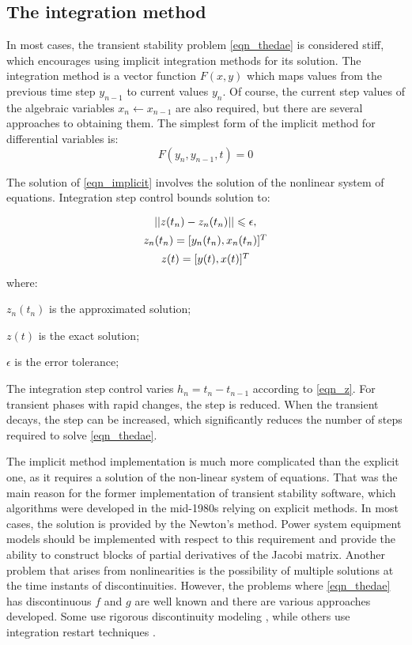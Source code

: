 \documentclass[lettersize,journal]{IEEEtran}
\begin{document}
\subsection{The integration method}

In most cases, the transient stability problem \eqref{eqn_thedae} is considered stiff, which encourages using implicit integration methods for its solution. The integration method is a vector function \(F(x,y)\) which maps values from the previous time step \(y_{n-1}\) to current values \(y_n\). Of course, the current step values of the algebraic variables \(x_{n} \leftarrow x_{n-1}\) are also required, but there are several approaches to obtaining them. The simplest form of the implicit method for differential variables is:
\begin{equation}
	\label{eqn_implicit}
	F(y_n,y_{n-1},t)=0
\end{equation}

The solution of \eqref{eqn_implicit} involves the solution of the nonlinear system of equations. Integration step control bounds solution to:
\begin{equation}
	\label{eqn_z}
	\def\arraystretch{1.4}
	\begin{array}{c}
		\vert\vert z(t_n)-z_n(t_n) \vert\vert \leqslant \epsilon, \\
		z_n(t_n)=[y_n(t_n), x_n(t_n)]^T	 \\
		z(t)=[y(t), x(t)]^T \\
	\end{array}
\end{equation}
\noindent where:
\begin{description}
	\item  \(z_n(t_n)\) is the approximated solution;
	\item  \(z(t)\) is the exact solution;
	\item  \(\epsilon\) is the error tolerance;
\end{description}

The integration step control varies \(h_{n}=t_{n}-t_{n-1}\) according to \eqref{eqn_z}. For transient phases with rapid changes, the step is reduced. When the transient decays, the step can be increased, which significantly reduces the number of steps required to solve \eqref{eqn_thedae}.

The implicit method implementation is much more complicated than the explicit one, as it requires a solution of the non-linear system of equations. That was the main reason for the former implementation of transient stability software, which algorithms were developed in the mid-1980s relying on explicit methods. In most cases, the solution is provided by the Newton's method. Power system equipment models should be implemented with respect to this requirement and provide the ability to construct blocks of partial derivatives of the Jacobi matrix. Another problem that arises from nonlinearities is the possibility of multiple solutions at the time instants of discontinuities. However, the problems where \eqref{eqn_thedae} has discontinuous \(f\) and \(g\) are well known and there are various approaches developed. Some use rigorous discontinuity modeling \cite{Filippov1988}, while others use integration restart techniques \cite{cellier06}.
\end{document}
